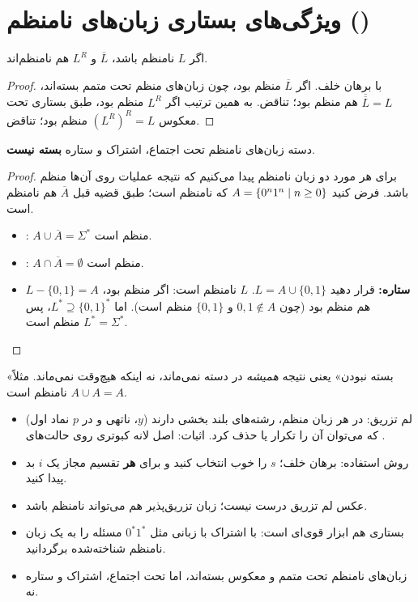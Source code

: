 \section{ویژگی‌های بستاری زبان‌های نامنظم ()}

\begin{theorem}
اگر $L$ نامنظم باشد، $\overline{L}$ و $L^R$ هم نامنظم‌اند.
\end{theorem}
\begin{proof}
با برهان خلف. اگر $\overline{L}$ منظم بود، چون زبان‌های منظم تحت متمم بسته‌اند، $\overline{\overline{L}}=L$ هم منظم بود؛ تناقض. به همین ترتیب اگر $L^R$ منظم بود، طبق بستاری تحت معکوس $(L^R)^R=L$ منظم بود؛ تناقض.
\end{proof}

\begin{theorem}
دسته زبان‌های نامنظم تحت اجتماع، اشتراک و ستاره \textbf{بسته نیست}.
\end{theorem}
\begin{proof}
برای هر مورد دو زبان نامنظم پیدا می‌کنیم که نتیجه عملیات روی آن‌ها منظم باشد. فرض کنید $A=\{0^n1^n\mid n\ge0\}$ که نامنظم است؛ طبق قضیه قبل $\overline{A}$ هم نامنظم است.
\begin{itemize}
\item {}: $A\cup\overline{A}=\Sigma^*$ منظم است.
\item {}: $A\cap\overline{A}=\emptyset$ منظم است.
\item \textbf{ستاره:} قرار دهید $L=A\cup\{0,1\}$. $L$ نامنظم است: اگر منظم بود، $L-\{0,1\}=A$ هم منظم بود (چون $0,1\notin A$ و $\{0,1\}$ منظم است). اما $L^*\supseteq\{0,1\}^*$، پس $L^*=\Sigma^*$ منظم است.\qedhere
\end{itemize}
\end{proof}

\begin{note}
«بسته نبودن» یعنی نتیجه \emph{همیشه} در دسته نمی‌ماند، نه اینکه هیچ‌وقت نمی‌ماند. مثلاً $A\cup A=A$ نامنظم است.
\end{note}

\begin{summary}
\begin{itemize}
\item لم تزریق: در هر زبان منظم، رشته‌های بلند بخشی دارند ($y$، ناتهی و در $p$ نماد اول) که می‌توان آن را تکرار یا حذف کرد. اثبات: اصل لانه کبوتری روی حالت‌های .
\item روش استفاده: برهان خلف؛ $s$ را خوب انتخاب کنید و برای \textbf{هر} تقسیم مجاز یک $i$ بد پیدا کنید.
\item عکس لم تزریق درست نیست؛ زبان تزریق‌پذیر هم می‌تواند نامنظم باشد.
\item بستاری هم ابزار قوی‌ای است: با اشتراک با زبانی مثل $0^*1^*$ مسئله را به یک زبان نامنظم شناخته‌شده برگردانید.
\item زبان‌های نامنظم تحت متمم و معکوس بسته‌اند، اما تحت اجتماع، اشتراک و ستاره نه.
\end{itemize}
\end{summary}
